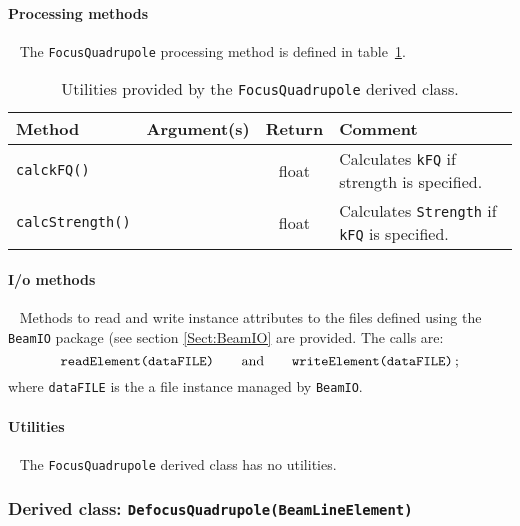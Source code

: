 \paragraph{Processing methods} ~\newline
\noindent
The \texttt{FocusQuadrupole} processing method is defined in
table~\ref{Tab:FQuad:Methods}.
\begin{table}[h]
  \caption{
    Utilities provided by the \texttt{FocusQuadrupole} derived
    class. 
  }
  \label{Tab:FQuad:Methods}
  \begin{center}
    \begin{tabular}{|l|c|c|p{7cm}|}
      \hline
      \textbf{Method} & \textbf{Argument(s)} & \textbf{Return} & \textbf{Comment}                     \\
      \hline
      \texttt{calckFQ()} &  & float & Calculates \texttt{kFQ} if strength is specified.               \\
      \texttt{calcStrength()} &  & float & Calculates \texttt{Strength} if \texttt{kFQ} is specified. \\
      \hline
    \end{tabular}
  \end{center}
\end{table}

\paragraph{I/o methods} ~\newline
\noindent
Methods to read and write instance attributes to the files defined
using the \texttt{BeamIO} package (see section \ref{Sect:BeamIO} are
provided.
The calls are:
\begin{equation}
  \texttt{readElement(dataFILE)} \quad \quad {\rm and }
      \quad \quad \texttt{writeElement(dataFILE)} \,; \nonumber
\end{equation}
where \texttt{dataFILE} is the a file instance managed by \texttt{BeamIO}.

\paragraph{Utilities} ~\newline
\noindent
The \texttt{FocusQuadrupole} derived class has no utilities.

\FloatBarrier

\subsubsection{Derived class: \texttt{DefocusQuadrupole(BeamLineElement)}}

